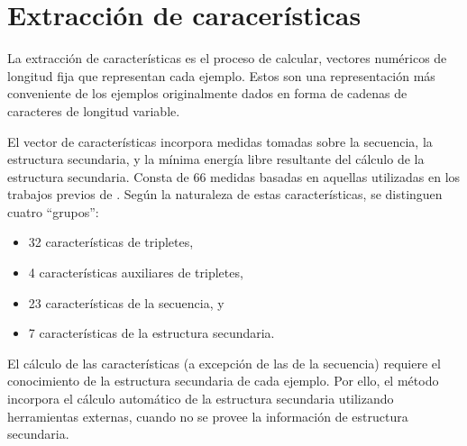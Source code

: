 %
%
%
\section{Extracción de caracerísticas}
%
La extracción de características es el proceso de calcular, vectores
numéricos de longitud fija que representan cada ejemplo.  Estos
 son una representación más conveniente
de los ejemplos originalmente dados en forma de cadenas de caracteres
de longitud variable.

El vector de características incorpora medidas tomadas sobre la
secuencia, la estructura secundaria, y la mínima energía libre
resultante del cálculo de la estructura secundaria. Consta de 66 medidas
basadas en aquellas utilizadas en los trabajos previos de \cite{xue, ng,
  batuwita}. Según la naturaleza de estas características, se
distinguen cuatro ``grupos'':
%
\begin{itemize}
\item 32 características de tripletes,
\item 4 características auxiliares de tripletes,
\item 23 características de la secuencia, y
\item 7 características de la estructura secundaria.
\end{itemize}
%
El cálculo de las características (a excepción de las de la secuencia)
requiere el conocimiento de la estructura secundaria de cada
ejemplo. Por ello, el método incorpora el cálculo automático de la
estructura secundaria utilizando herramientas externas, cuando no se
provee la información de estructura secundaria.

